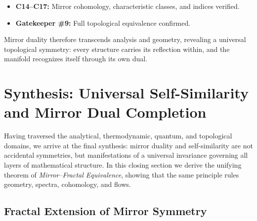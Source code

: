 \begin{itemize}[noitemsep,topsep=0pt]
\item \textbf{C14–C17:} Mirror cohomology, characteristic classes, and indices verified.
\item \textbf{Gatekeeper \#9:} Full topological equivalence confirmed.
\end{itemize}

Mirror duality therefore transcends analysis and geometry,
revealing a universal topological symmetry:
every structure carries its reflection within,
and the manifold recognizes itself through its own dual.


\section{Synthesis: Universal Self-Similarity and Mirror Dual Completion}\relax \hspace{0pt}

Having traversed the analytical, thermodynamic, quantum, and topological domains,
we arrive at the final synthesis:
mirror duality and self-similarity are not accidental symmetries,
but manifestations of a universal invariance
governing all layers of mathematical structure.
In this closing section we derive the unifying theorem
of \emph{Mirror–Fractal Equivalence},
showing that the same principle rules geometry, spectra, cohomology, and flows.

\subsection{Fractal Extension of Mirror Symmetry}\relax \hspace{0pt}

